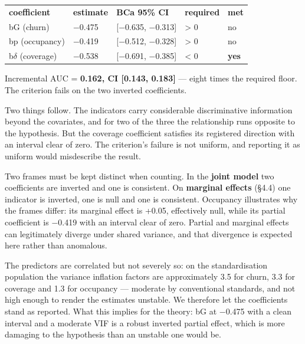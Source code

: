 \documentclass[
  11pt,
]{article}
\newcounter{none} %
\begin{document}
{\def\LTcaptype{none} %
\begin{longtable}[]{@{}
  >{\centering\arraybackslash}p{}
  >{\centering\arraybackslash}p{}
  >{\centering\arraybackslash}p{}
  >{\centering\arraybackslash}p{}
  >{\centering\arraybackslash}p{}@{}}
\toprule\noalign{}
\endhead
\bottomrule\noalign{}
\endlastfoot
\textbf{coefficient} & \textbf{estimate} & \textbf{BCa 95\% CI} &
\textbf{required} & \textbf{met} \\
bG (churn) & −0.475 & {[}−0.635, −0.313{]} & \textgreater{} 0 & no \\
bp (occupancy) & −0.419 & {[}−0.512, −0.328{]} & \textgreater{} 0 &
no \\
b\(\delta\) (coverage) & −0.538 & {[}−0.691, −0.385{]} & \textless{} 0 &
\textbf{yes} \\
\end{longtable}
}

Incremental AUC = \textbf{0.162, CI {[}0.143, 0.183{]}} --- eight times
the required floor. The criterion fails on the two inverted
coefficients.

Two things follow. The indicators carry considerable discriminative
information beyond the covariates, and for two of the three the
relationship runs opposite to the hypothesis. But the coverage
coefficient satisfies its registered direction with an interval clear of
zero. The criterion's failure is not uniform, and reporting it as
uniform would misdescribe the result.

Two frames must be kept distinct when counting. In the \textbf{joint
model} two coefficients are inverted and one is consistent. On
\textbf{marginal effects} (§4.4) one indicator is inverted, one is null
and one is consistent. Occupancy illustrates why the frames differ: its
marginal effect is +0.05, effectively null, while its partial
coefficient is −0.419 with an interval clear of zero. Partial and
marginal effects can legitimately diverge under shared variance, and
that divergence is expected here rather than anomalous.

The predictors are correlated but not severely so: on the
standardisation population the variance inflation factors are
approximately 3.5 for churn, 3.3 for coverage and 1.3 for occupancy ---
moderate by conventional standards, and not high enough to render the
estimates unstable. We therefore let the coefficients stand as reported.
What this implies for the theory: bG at −0.475 with a clean interval and
a moderate VIF is a robust inverted partial effect, which is more
damaging to the hypothesis than an unstable one would be.
\end{document}
